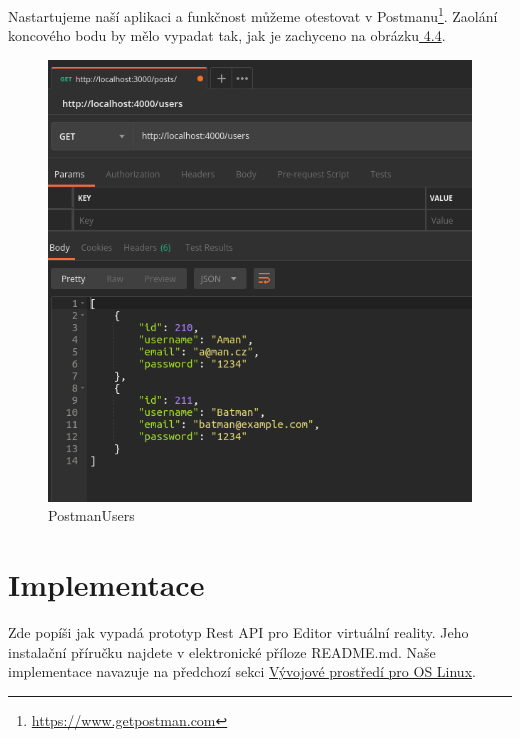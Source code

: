 \documentclass[thesis=B,czech]{FITthesis}[2012/06/26]
\begin{document}
            Nastartujeme naší aplikaci a funkčnost můžeme otestovat v Postmanu\footnote{\url{https://www.getpostman.com}}. Zaolání koncového bodu by mělo vypadat tak, jak je zachyceno na obrázku\hyperref[fig:PostmanUsers]{ 4.4}.
        \begin{figure}[h!]
            \includegraphics[width=\linewidth]{postmanUsers}
            \caption{PostmanUsers}
        \end{figure}
    \newpage
    \section{Implementace} \label{impl}
        Zde popíši jak vypadá prototyp Rest API pro Editor virtuální reality. Jeho instalační příručku najdete v elektronické příloze README.md. Naše implementace navazuje na předchozí sekci \hyperref[vyvProstredi]{Vývojové prostředí pro OS Linux}.
        
\end{document}

